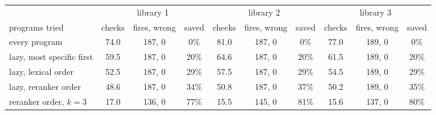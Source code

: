 \begin{tabular}{lccccccccc}
\toprule
& \multicolumn{3}{c}{library 1} & \multicolumn{3}{c}{library 2} & \multicolumn{3}{c}{library 3} \\
\cmidrule(lr){2-4}\cmidrule(lr){5-7}\cmidrule(lr){8-10}
programs tried & checks & fires, wrong & saved & checks & fires, wrong & saved & checks & fires, wrong & saved \\
\midrule
every program & 74.0 & 187, 0 & 0\% & 81.0 & 187, 0 & 0\% & 77.0 & 189, 0 & 0\% \\
lazy, most specific first & 59.5 & 187, 0 & 20\% & 64.6 & 187, 0 & 20\% & 61.5 & 189, 0 & 20\% \\
lazy, lexical order & 52.5 & 187, 0 & 29\% & 57.5 & 187, 0 & 29\% & 54.5 & 189, 0 & 29\% \\
lazy, reranker order & 48.6 & 187, 0 & 34\% & 50.8 & 187, 0 & 37\% & 50.2 & 189, 0 & 35\% \\
reranker order, $k=3$ & 17.0 & 136, 0 & 77\% & 15.5 & 145, 0 & 81\% & 15.6 & 137, 0 & 80\% \\
\bottomrule
\end{tabular}

